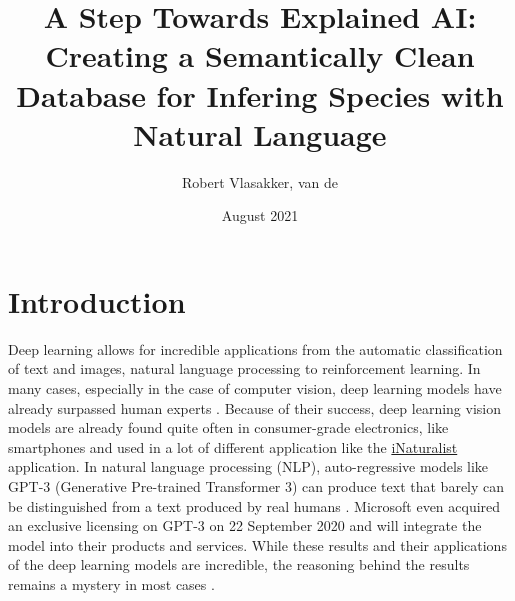 \documentclass{article}
\title{A Step Towards Explained AI: Creating a Semantically Clean Database for Infering Species with Natural Language}
\author{Robert Vlasakker, van de}
\date{August 2021}
\begin{document}
\graphicspath{ {./figures/} }

\maketitle

\section{Introduction}
Deep learning allows for incredible applications from the automatic classification of text and images, natural language processing to reinforcement learning.
In many cases, especially in the case of computer vision, deep learning models have already surpassed human experts \cite{he_delving_2015}.
Because of their success, deep learning vision models are already found quite often in consumer-grade electronics, like smartphones and used in a lot of different application like the \href{https://www.inaturalist.org/}{iNaturalist} application.
In natural language processing (NLP), auto-regressive models like GPT-3 (Generative Pre-trained Transformer 3) can produce text that barely can be distinguished from a text produced by real humans \cite{brown_language_2020}.
Microsoft even acquired an exclusive licensing on GPT-3 on 22 September 2020 and will integrate the model into their products and services.
While these results and their applications of the deep learning models are incredible, the reasoning behind the results remains a mystery in most cases \cite{li_interpretable_2021, losch_interpretability_2019}.
\end{document}

